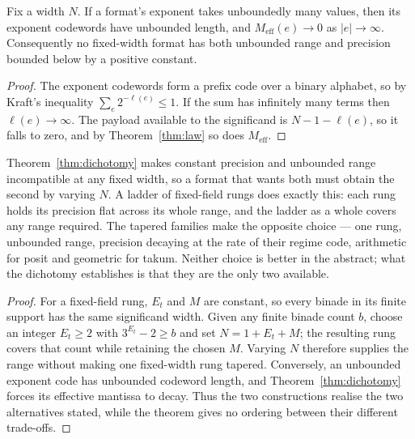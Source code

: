 \begin{theorem}
\label{thm:dichotomy}
Fix a width $N$. If a format's exponent takes unboundedly many values, then its
exponent codewords have unbounded length, and
$M_{\mathrm{eff}}(e)\to0$ as $|e|\to\infty$. Consequently no fixed-width format
has both unbounded range and precision bounded below by a positive constant.
\end{theorem}

\begin{proof}
The exponent codewords form a prefix code over a binary alphabet, so by Kraft's
inequality $\sum_{e} 2^{-\ell(e)} \leq 1$. If the sum has infinitely many terms
then $\ell(e) \to \infty$. The payload available to the significand is
$N - 1 - \ell(e)$, so it falls to zero, and by Theorem~\ref{thm:law} so does
$M_{\mathrm{eff}}$.
\end{proof}

\begin{corollary}
\label{cor:ladder}
Theorem~\ref{thm:dichotomy} makes constant precision and unbounded range
incompatible at any fixed width, so a format that wants both must obtain the
second by varying $N$. A ladder of fixed-field rungs does exactly this: each rung
holds its precision flat across its whole range, and the ladder as a whole covers
any range required. The tapered families make the opposite choice --- one rung,
unbounded range, precision decaying at the rate of their regime code, arithmetic
for posit and geometric for takum. Neither choice is better in the abstract; what
the dichotomy establishes is that they are the only two available.
\end{corollary}
\begin{proof}
For a fixed-field rung, $E_t$ and $M$ are constant, so every binade in its
finite support has the same significand width. Given any finite binade count
$b$, choose an integer $E_t\ge2$ with $3^{E_t}-2\ge b$ and set
$N=1+E_t+M$; the resulting rung covers that count while retaining the chosen
$M$. Varying $N$ therefore supplies the range without making one fixed-width
rung tapered. Conversely, an unbounded exponent code has unbounded codeword
length, and Theorem~\ref{thm:dichotomy} forces its effective mantissa to decay.
Thus the two constructions realise the two alternatives stated, while the
theorem gives no ordering between their different trade-offs.
\end{proof}

